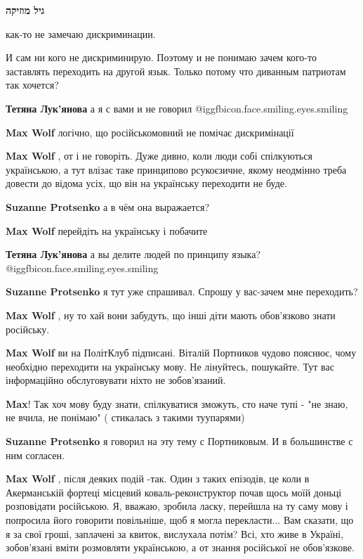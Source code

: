 \begin{itemize}
\begin{itemize}
\textbf{גיל מוזיקה} 

как-то не замечаю дискриминации.

И сам ни кого не дискриминирую. Поэтому и не понимаю зачем кого-то заставлять
переходить на другой язык. Только потому что диванным патриотам так хочется?

\textbf{Тетяна Лук'янова} а я с вами и не говорил @igg{fbicon.face.smiling.eyes.smiling} 

\textbf{Max Wolf} логічно, що російськомовний не помічає дискримінації

\textbf{Max Wolf} , от і не говоріть. Дуже дивно, коли люди собі спілкуються українською, а тут влізає таке принципово рсукоєзичне, якому неодмінно треба довести до відома усіх, що він на українську переходити не буде.

\textbf{Suzanne Protsenko} а в чём она выражается?

\textbf{Max Wolf} перейдіть на українську і побачите

\textbf{Тетяна Лук'янова} а вы делите людей по принципу языка?  @igg{fbicon.face.smiling.eyes.smiling} 

\textbf{Suzanne Protsenko} я тут уже спрашивал. Спрошу у вас-зачем мне переходить?

\textbf{Max Wolf} , ну то хай вони забудуть, що інші діти мають обов'язково знати російську.

\textbf{Max Wolf} ви на ПолітКлуб підписані. Віталій Портников чудово пояснює, чому необхідно переходити на українську мову. Не лінуйтесь, пошукайте. Тут вас інформаційно обслуговувати ніхто не зобов’язаний.

\textbf{Max}! Так хоч мову буду знати, спілкуватися зможуть, сто наче тупі - "не знаю, не вчила, не понімаю" ( стикалась з такими туупарями)

\textbf{Suzanne Protsenko} я говорил на эту тему с Портниковым.
И в большинстве с ним согласен.

\textbf{Max Wolf} , після деяких подій -так. Один з таких епізодів, це коли в Акерманській фортеці місцевий коваль-реконструктор почав щось моїй доньці розповідати російською. Я, вважаю, зробила ласку, перейшла на ту саму мову і попросила його говорити повільніше, щоб я могла перекласти... Вам сказати, що я за свої гроші, заплачені за квиток, вислухала потім? Всі, хто живе в Україні, зобов'язані вміти розмовляти українською, а от знання російської не обов'язкове.


\end{itemize}
\end{itemize}
